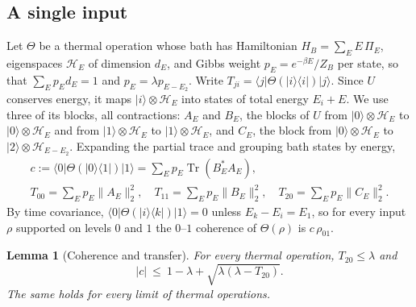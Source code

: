 \documentclass[11pt]{article}
\newtheorem{lemma}[theorem]{Lemma}
\theoremstyle{definition}
\theoremstyle{remark}
\newcommand{\Tr}{\operatorname{Tr}}
\begin{document}
\subsection{A single input}

Let $\Theta$ be a thermal operation whose bath has Hamiltonian $H_B=\sum_EE\,\Pi_E$, eigenspaces $\mathcal H_E$ of dimension $d_E$, and Gibbs weight $p_E=e^{-\beta E}/Z_B$ per state, so that $\sum_Ep_Ed_E=1$ and $p_E=\lambda p_{E-E_2}$. Write $T_{ji}=\langle j|\Theta(|i\rangle\langle i|)|j\rangle$. Since $U$ conserves energy, it maps $|i\rangle\otimes\mathcal H_E$ into states of total energy $E_i+E$. We use three of its blocks, all contractions: $A_E$ and $B_E$, the blocks of $U$ from $|0\rangle\otimes\mathcal H_E$ to $|0\rangle\otimes\mathcal H_E$ and from $|1\rangle\otimes\mathcal H_E$ to $|1\rangle\otimes\mathcal H_E$, and $C_E$, the block from $|0\rangle\otimes\mathcal H_E$ to $|2\rangle\otimes\mathcal H_{E-E_2}$. Expanding the partial trace and grouping bath states by energy,
\begin{equation}\label{eq:modes}
\begin{gathered}
c:=\langle0|\Theta(|0\rangle\langle1|)|1\rangle=\sum_Ep_E\Tr(B_E^*A_E),\\
T_{00}=\sum_Ep_E\|A_E\|_2^2,\quad T_{11}=\sum_Ep_E\|B_E\|_2^2,\quad T_{20}=\sum_Ep_E\|C_E\|_2^2.
\end{gathered}
\end{equation}
By time covariance, $\langle0|\Theta(|i\rangle\langle k|)|1\rangle=0$ unless $E_k-E_i=E_1$, so for every input $\rho$ supported on levels $0$ and $1$ the $0$--$1$ coherence of $\Theta(\rho)$ is $c\,\rho_{01}$.

\begin{lemma}[Coherence and transfer]\label{lem:coherence}
For every thermal operation, $T_{20}\le\lambda$ and
\[
|c|\ \le\ 1-\lambda+\sqrt{\lambda(\lambda-T_{20})}.
\]
The same holds for every limit of thermal operations.
\end{lemma}
\end{document}
